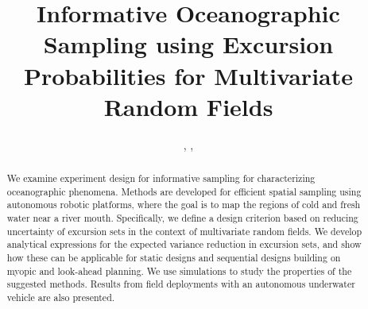 \documentclass[aoas]{imsart}
\begin{document}
\begin{frontmatter}

\title{Informative Oceanographic Sampling using Excursion Probabilities for Multivariate Random Fields}


\author{ ,  ,     \and {} }

\address{Department of Marine Technology\\ Trondheim, Norway}

\address{Department of Mathematical Sciences }

\address{Idiap }

\address{Department of Engineering Cybernetics,}


\begin{abstract}
  We examine experiment design for informative sampling for
  characterizing oceanographic phenomena. Methods are developed
  for efficient spatial sampling using autonomous robotic platforms,
  where the goal is to map the regions of cold and fresh water near a
  river mouth. Specifically, we define a design criterion based on
  reducing uncertainty of excursion sets in the context of multivariate
  random fields. We develop analytical expressions for the expected
  variance reduction in excursion sets, and show how these can be
  applicable for static designs and sequential designs building on
  myopic and look-ahead planning. We use simulations to study the
  properties of the suggested methods. Results from field
  deployments with an autonomous underwater vehicle are also presented.


\end{abstract}
\end{frontmatter}
\end{document}
